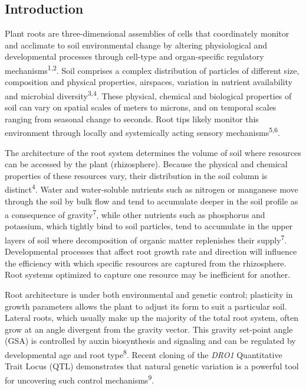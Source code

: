 \documentclass[]{article}
\begin{document}
\subsection{Introduction}\label{introduction}

Plant roots are three-dimensional assemblies of cells that coordinately
monitor and acclimate to soil environmental change by altering
physiological and developmental processes through cell-type and
organ-specific regulatory mechanisms\textsuperscript{1,2}. Soil
comprises a complex distribution of particles of different size,
composition and physical properties, airspaces, variation in nutrient
availability and microbial diversity\textsuperscript{3,4}. These
physical, chemical and biological properties of soil can vary on spatial
scales of meters to microns, and on temporal scales ranging from
seasonal change to seconds. Root tips likely monitor this environment
through locally and systemically acting sensory
mechanisms\textsuperscript{5,6}.

The architecture of the root system determines the volume of soil where
resources can be accessed by the plant (rhizosphere). Because the
physical and chemical properties of these resources vary, their
distribution in the soil column is distinct\textsuperscript{4}. Water
and water-soluble nutrients such as nitrogen or manganese move through
the soil by bulk flow and tend to accumulate deeper in the soil profile
as a consequence of gravity\textsuperscript{7}, while other nutrients
such as phosphorus and potassium, which tightly bind to soil particles,
tend to accumulate in the upper layers of soil where decomposition of
organic matter replenishes their supply\textsuperscript{7}.
Developmental processes that affect root growth rate and direction will
influence the efficiency with which specific resources are captured from
the rhizosphere. Root systems optimized to capture one resource may be
inefficient for another.

Root architecture is under both environmental and genetic control;
plasticity in growth parameters allows the plant to adjust its form to
suit a particular soil. Lateral roots, which usually make up the
majority of the total root system, often grow at an angle divergent from
the gravity vector. This gravity set-point angle (GSA) is controlled by
auxin biosynthesis and signaling and can be regulated by developmental
age and root type\textsuperscript{8}. Recent cloning of the \emph{DRO1}
Quantitative Trait Locus (QTL) demonstrates that natural genetic
variation is a powerful tool for uncovering such control
mechanisms\textsuperscript{9}.
\end{document}
